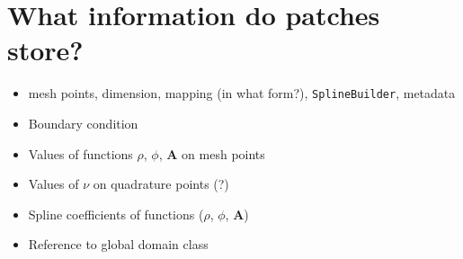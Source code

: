 \documentclass[presentation.tex]{subfiles}
\begin{document}
\section*{What information do patches store?}
\begin{itemize}
    \item mesh points, dimension, mapping (in what form?),
            \texttt{SplineBuilder}, metadata
    \item Boundary condition 
    \item Values of functions $\rho$, $\phi$, $\mathbf{A}$ on mesh points
    \item Values of $\nu$ on quadrature points (?)
    \item Spline coefficients of functions ($\rho$, $\phi$, $\mathbf{A}$)
    \item Reference to global domain class
\end{itemize}
\end{document}
